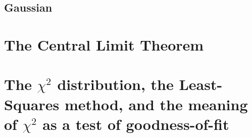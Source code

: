 \documentclass{revtex4}
\begin{document}
\subsection{Gaussian}
\section{The Central Limit Theorem}
\section{The $\chi^2$ distribution, the Least-Squares method, and the
  meaning of $\chi^2$ as a test of goodness-of-fit}
\end{document}
